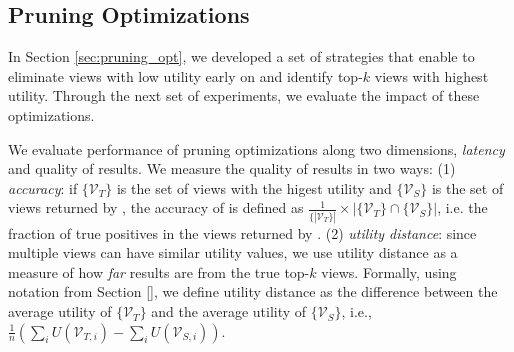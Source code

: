 \subsection{Pruning Optimizations}
\label{sec:custom_execution_engine_expts}
In Section \ref{sec:pruning_opt}, we developed a set of strategies that enable \SeeDB to eliminate views with low utility early on and identify top-$k$ views with highest utility.
Through the next set of experiments, we evaluate 
the impact of these optimizations.

We evaluate performance of pruning optimizations along two dimensions, {\em latency} and
quality of results.
We measure the quality of results in two ways: 
(1) {\em accuracy}: if $\{\mathcal{V}_T\}$
is the set of views with the higest utility and $\{\mathcal{V}_S\}$ is the set of views returned by
\SeeDB, the accuracy of \SeeDB is defined as $\frac{1}{\{|\mathcal{V}_T\}|} \times 
|\{\mathcal{V}_T\} \cap \{\mathcal{V}_S\}|$, i.e. the
fraction of true positives in the views returned by \SeeDB. (2) {\em utility distance}: since multiple
views can have similar utility values, we use utility distance as a measure of how {\it far} \SeeDB 
results are from the true top-$k$ views. 
Formally, using notation from Section \ref{}, we define utility distance as the difference between the average utility of $\{\mathcal{V}_T\}$ 
and the average utility of $\{\mathcal{V}_S\}$, i.e., $\frac{1}{n}(\sum_{i}U(\mathcal{V}_{T,i}) - 
\sum_{i}U(\mathcal{V}_{S,i}))$.

